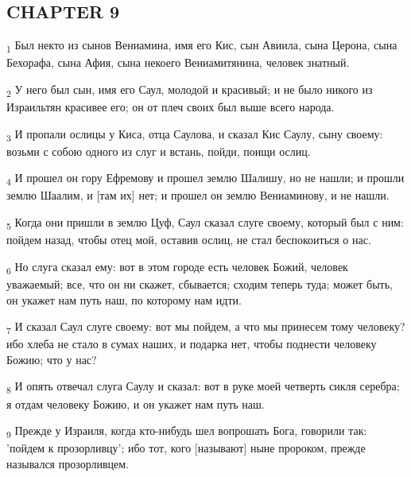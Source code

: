 \subsection{CHAPTER 9}
\begin{tcolorbox}
\textsubscript{1} Был некто из сынов Вениамина, имя его Кис, сын Авиила, сына Церона, сына Бехорафа, сына Афия, сына некоего Вениамитянина, человек знатный.
\end{tcolorbox}
\begin{tcolorbox}
\textsubscript{2} У него был сын, имя его Саул, молодой и красивый; и не было никого из Израильтян красивее его; он от плеч своих был выше всего народа.
\end{tcolorbox}
\begin{tcolorbox}
\textsubscript{3} И пропали ослицы у Киса, отца Саулова, и сказал Кис Саулу, сыну своему: возьми с собою одного из слуг и встань, пойди, поищи ослиц.
\end{tcolorbox}
\begin{tcolorbox}
\textsubscript{4} И прошел он гору Ефремову и прошел землю Шалишу, но не нашли; и прошли землю Шаалим, и [там их] нет; и прошел он землю Вениаминову, и не нашли.
\end{tcolorbox}
\begin{tcolorbox}
\textsubscript{5} Когда они пришли в землю Цуф, Саул сказал слуге своему, который был с ним: пойдем назад, чтобы отец мой, оставив ослиц, не стал беспокоиться о нас.
\end{tcolorbox}
\begin{tcolorbox}
\textsubscript{6} Но слуга сказал ему: вот в этом городе есть человек Божий, человек уважаемый; все, что он ни скажет, сбывается; сходим теперь туда; может быть, он укажет нам путь наш, по которому нам идти.
\end{tcolorbox}
\begin{tcolorbox}
\textsubscript{7} И сказал Саул слуге своему: вот мы пойдем, а что мы принесем тому человеку? ибо хлеба не стало в сумах наших, и подарка нет, чтобы поднести человеку Божию; что у нас?
\end{tcolorbox}
\begin{tcolorbox}
\textsubscript{8} И опять отвечал слуга Саулу и сказал: вот в руке моей четверть сикля серебра; я отдам человеку Божию, и он укажет нам путь наш.
\end{tcolorbox}
\begin{tcolorbox}
\textsubscript{9} Прежде у Израиля, когда кто-нибудь шел вопрошать Бога, говорили так: 'пойдем к прозорливцу'; ибо тот, кого [называют] ныне пророком, прежде назывался прозорливцем.
\end{tcolorbox}

